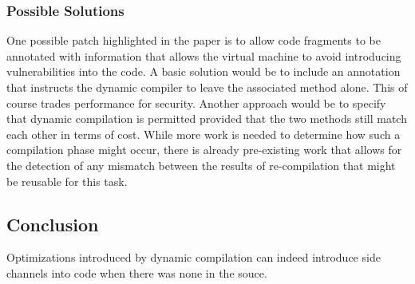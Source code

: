\subsubsection{Possible Solutions}
One possible patch highlighted in the paper is to allow code fragments to be
annotated with information that allows the virtual machine to avoid introducing
vulnerabilities into the code. A basic solution would be to include an
annotation that instructs the dynamic compiler to leave the associated method
alone. This of course trades performance for security. Another approach would
be to specify that dynamic compilation is permitted provided that the two
methods still match each other in terms of cost. While more work is needed to
determine how such a compilation phase might occur, there is already
pre-existing work that allows for the detection of any mismatch between the
results of re-compilation that might be reusable for this task. 
 
\subsection{Conclusion}
Optimizations introduced by dynamic compilation can indeed introduce side
channels into code when there was none in the souce. 
